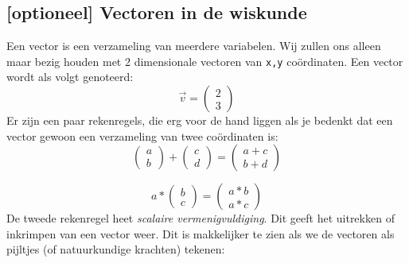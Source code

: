 \documentclass{../qh_exercise}
\begin{document}
\subsection{[optioneel] Vectoren in de wiskunde}
Een vector is een verzameling van meerdere variabelen. Wij zullen ons alleen maar bezig houden met 2 dimensionale vectoren van \texttt{x,y} co\"ordinaten.
Een vector wordt als volgt genoteerd: 
$$
\vec{v}=
\begin{pmatrix}
2\\3
\end{pmatrix}
$$
Er zijn een paar rekenregels, die erg voor de hand liggen als je bedenkt dat een vector gewoon een verzameling van twee co\"ordinaten is:
$$
\begin{pmatrix}
a\\b
\end{pmatrix}
+
\begin{pmatrix}
c\\d
\end{pmatrix}
=
\begin{pmatrix}
a + c\\b + d
\end{pmatrix}
$$

$$
a * 
\begin{pmatrix}
b \\ c
\end{pmatrix}
=
\begin{pmatrix}
a*b\\a*c
\end{pmatrix}
$$
De tweede rekenregel heet \textit{scalaire vermenigvuldiging}. Dit geeft het uitrekken of inkrimpen van een vector weer. Dit is makkelijker te zien als we de vectoren als pijltjes (of natuurkundige krachten) tekenen:\\
\end{document}
